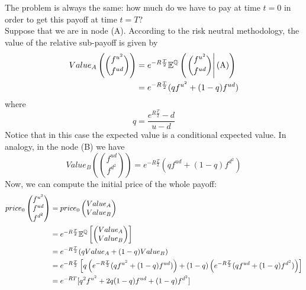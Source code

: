 The problem is always the same: how much do we have to pay at time $t=0$ in order to get this payoff at time $t=T$?\\
Suppose that we are in node (A). According to the risk neutral methodology, the value of the relative sub-payoff is given by
\begin{align}
    \notag Value_A\left(\binom{f^{u^2}}{f^{ud}}\right)
    &=
    \notag e^{-R\frac{T}{2}}\mathbb{E}^{\mathbb{Q}}\left(\left.\binom{f^{u^2}}{f^{ud}}\right|\mbox{(A)}\right)\\
    &=
    e^{-R\frac{T}{2}}(qf^{u^2}+(1-q)f^{ud})
\end{align}
where
\begin{equation}\label{qT2}
    q = \dfrac{e^{R\frac{T}{2}}-d}{u-d}
\end{equation}
Notice that in this case the expected value is a conditional expected value. In analogy, in the node (B) we have
\begin{equation}
    Value_B\left(\binom{f^{ud}}{f^{d^2}}\right) = e^{-R\frac{T}{2}}(qf^{ud}+(1-q)f^{d^2})
\end{equation}
Now, we can compute the initial price of the whole payoff:
\begin{align}
    \notag price_0\left(
    \begin{matrix}
        f^{u^2} \\ f^{ud} \\ f^{d^2}
    \end{matrix}
    \right)
    &=
    price_0\left(\begin{matrix}
        Value_A \\  Value_B
    \end{matrix}\right)\\
    &=
    \notag e^{-R\frac{T}{2}}\mathbb{E}^{\mathbb{Q}}\left[\left(
    \begin{matrix}
        Value_A \\  Value_B
    \end{matrix}\right)
    \right]\\
    &=
    \notag e^{-R\frac{T}{2}}(q Value_A+(1-q)Value_B)\\
    &=
    \notag e^{-R\frac{T}{2}}\left[q\left(e^{-R\frac{T}{2}}(qf^{u^2}+(1-q)f^{ud})\right) + (1-q)\left(e^{-R\frac{T}{2}}(qf^{ud}+(1-q)f^{d^2})\right)\right]\\
    &=
    e^{-RT}[q^2f^{u^2}+2q(1-q)f^{ud}+(1-q)f^{d^2}]
\end{align}
